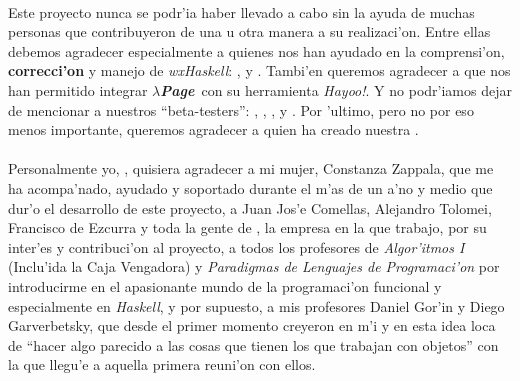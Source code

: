 \documentclass[a4paper]{article}
\newcommand{\haskell}{\textsl{Haskell}}
\newcommand{\hpage}{\textbf{\textsl{$\lambda$Page}}}
\begin{document}
\paragraph{}Este proyecto nunca se podr'ia haber llevado a cabo sin la ayuda de muchas personas que contribuyeron de una u otra manera a su realizaci'on.  Entre ellas debemos agradecer especialmente a quienes nos han ayudado en la comprensi'on, \textbf{correcci'on} y manejo de \textsl{wxHaskell}: ,  y . Tambi'en queremos agradecer a  que nos han permitido integrar \hpage\ con su herramienta \textsl{Hayoo!}.  Y no podr'iamos dejar de mencionar a nuestros ``beta-testers'': , , ,  y .  Por 'ultimo, pero no por eso menos importante, queremos agradecer a  quien ha creado nuestra .
\paragraph{}Personalmente yo, , quisiera agradecer a mi mujer, Constanza Zappala, que me ha acompa'nado, ayudado y soportado durante el m'as de un a'no y medio que dur'o el desarrollo de este proyecto, a Juan Jos'e Comellas, Alejandro Tolomei, Francisco de Ezcurra y toda la gente de , la empresa en la que trabajo, por su inter'es y contribuci'on al proyecto, a todos los profesores de \textsl{Algor'itmos I} (Inclu'ida la Caja Vengadora) y \textsl{Paradigmas de Lenguajes de Programaci'on} por introducirme en el apasionante mundo de la programaci'on funcional y especialmente en \haskell, y por supuesto, a mis profesores Daniel Gor'in y Diego Garverbetsky, que desde el primer momento creyeron en m'i y en esta idea loca de ``hacer algo parecido a las cosas que tienen los que trabajan con objetos'' con la que llegu'e a aquella primera reuni'on con ellos.
\newpage

\end{document}
